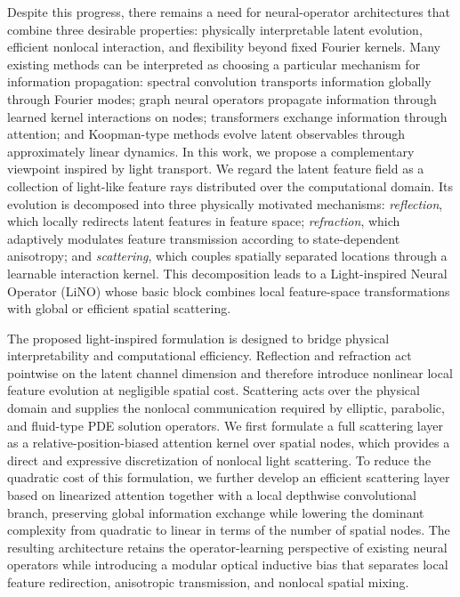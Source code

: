 \documentclass{article}
\begin{document}
Despite this progress, there remains a need for neural-operator architectures that combine three desirable properties: physically interpretable latent evolution, efficient nonlocal interaction, and flexibility beyond fixed Fourier kernels. Many existing methods can be interpreted as choosing a particular mechanism for information propagation: spectral convolution transports information globally through Fourier modes; graph neural operators propagate information through learned kernel interactions on nodes; transformers exchange information through attention; and Koopman-type methods evolve latent observables through approximately linear dynamics. In this work, we propose a complementary viewpoint inspired by light transport. We regard the latent feature field as a collection of light-like feature rays distributed over the computational domain. Its evolution is decomposed into three physically motivated mechanisms: \emph{reflection}, which locally redirects latent features in feature space; \emph{refraction}, which adaptively modulates feature transmission according to state-dependent anisotropy; and \emph{scattering}, which couples spatially separated locations through a learnable interaction kernel. This decomposition leads to a Light-inspired Neural Operator (LiNO) whose basic block combines local feature-space transformations with global or efficient spatial scattering.

The proposed light-inspired formulation is designed to bridge physical interpretability and computational efficiency. Reflection and refraction act pointwise on the latent channel dimension and therefore introduce nonlinear local feature evolution at negligible spatial cost. Scattering acts over the physical domain and supplies the nonlocal communication required by elliptic, parabolic, and fluid-type PDE solution operators. We first formulate a full scattering layer as a relative-position-biased attention kernel over spatial nodes, which provides a direct and expressive discretization of nonlocal light scattering. To reduce the quadratic cost of this formulation, we further develop an efficient scattering layer based on linearized attention together with a local depthwise convolutional branch, preserving global information exchange while lowering the dominant complexity from quadratic to linear in terms of the number of spatial nodes. The resulting architecture retains the operator-learning perspective of existing neural operators while introducing a modular optical inductive bias that separates local feature redirection, anisotropic transmission, and nonlocal spatial mixing.
\end{document}
